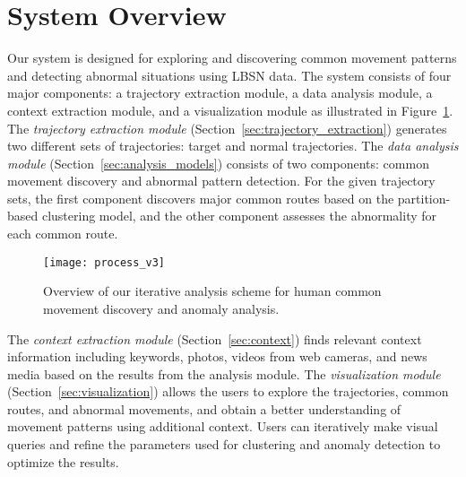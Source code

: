 \section{System Overview}

Our system is designed for exploring and discovering common movement patterns and detecting abnormal situations using LBSN data. The system consists of four major components: a trajectory extraction module, a data analysis module, a context extraction module, and a visualization module as illustrated in Figure~\ref{fig:process}.
The \textit{trajectory extraction module} (Section~\ref{sec:trajectory_extraction}) generates two different sets of trajectories: target and normal trajectories.
The \textit{data analysis module} (Section~\ref{sec:analysis_models}) consists of two components: common movement discovery and abnormal pattern detection. 
For the given trajectory sets, the first component discovers major common routes based on the partition-based clustering model, and the other component assesses the abnormality for each common route.
\begin{figure}[hbt]
\centering
\texttt{[image: process\_v3]}
\caption{Overview of our iterative analysis scheme for human common movement discovery and anomaly analysis.}
\label{fig:process}
\end{figure}
The \textit{context extraction module} (Section~\ref{sec:context}) finds relevant context information including keywords, photos, videos from web cameras, and news media based on the results from the analysis module.
The \textit{visualization module} (Section~\ref{sec:visualization}) allows the users to explore the trajectories, common routes, and abnormal movements, and obtain a better understanding of movement patterns using additional context.
Users can iteratively make visual queries and refine the parameters used for clustering and anomaly detection to optimize the results.